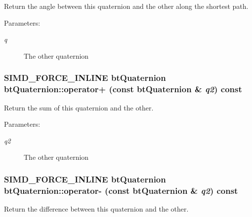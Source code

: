 Return the angle between this quaternion and the other along the shortest path. 

\begin{Desc}
\item[Parameters:]
\begin{description}
\item[{\em q}]The other quaternion \end{description}
\end{Desc}
\hypertarget{classbt_quaternion_e59598d8706cfaaf716509f93846010e}{
\subsubsection[operator+]{\setlength{\rightskip}{0pt plus 5cm}SIMD\_\-FORCE\_\-INLINE {\bf btQuaternion} btQuaternion::operator+ (const {\bf btQuaternion} \& {\em q2}) const}}
\label{classbt_quaternion_e59598d8706cfaaf716509f93846010e}


Return the sum of this quaternion and the other. 

\begin{Desc}
\item[Parameters:]
\begin{description}
\item[{\em q2}]The other quaternion \end{description}
\end{Desc}
\hypertarget{classbt_quaternion_10ee93d7c0a20d0630fa8e8de85bad0c}{
\subsubsection[operator-]{\setlength{\rightskip}{0pt plus 5cm}SIMD\_\-FORCE\_\-INLINE {\bf btQuaternion} btQuaternion::operator- (const {\bf btQuaternion} \& {\em q2}) const}}
\label{classbt_quaternion_10ee93d7c0a20d0630fa8e8de85bad0c}


Return the difference between this quaternion and the other. 

